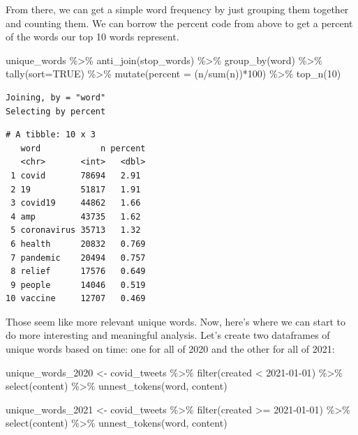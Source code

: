 \documentclass[
  letterpaper,
  DIV=11,
  numbers=noendperiod]{scrreprt}
\newenvironment{Shaded}{\begin{snugshade}}{\end{snugshade}}
\newcommand{\AttributeTok}[1]{\textcolor[rgb]{0.40,0.45,0.13}{#1}}
\newcommand{\ConstantTok}[1]{\textcolor[rgb]{0.56,0.35,0.01}{#1}}
\newcommand{\DecValTok}[1]{\textcolor[rgb]{0.68,0.00,0.00}{#1}}
\newcommand{\FunctionTok}[1]{\textcolor[rgb]{0.28,0.35,0.67}{#1}}
\newcommand{\NormalTok}[1]{\textcolor[rgb]{0.00,0.23,0.31}{#1}}
\newcommand{\OtherTok}[1]{\textcolor[rgb]{0.00,0.23,0.31}{#1}}
\newcommand{\SpecialCharTok}[1]{\textcolor[rgb]{0.37,0.37,0.37}{#1}}
\newcommand{\StringTok}[1]{\textcolor[rgb]{0.13,0.47,0.30}{#1}}
\begin{document}
From there, we can get a simple word frequency by just grouping them
together and counting them. We can borrow the percent code from above to
get a percent of the words our top 10 words represent.

\begin{Shaded}
\begin{Highlighting}[]
\NormalTok{unique\_words }\SpecialCharTok{\%\textgreater{}\%}
  \FunctionTok{anti\_join}\NormalTok{(stop\_words) }\SpecialCharTok{\%\textgreater{}\%}
  \FunctionTok{group\_by}\NormalTok{(word) }\SpecialCharTok{\%\textgreater{}\%}
  \FunctionTok{tally}\NormalTok{(}\AttributeTok{sort=}\ConstantTok{TRUE}\NormalTok{) }\SpecialCharTok{\%\textgreater{}\%}
  \FunctionTok{mutate}\NormalTok{(}\AttributeTok{percent =}\NormalTok{ (n}\SpecialCharTok{/}\FunctionTok{sum}\NormalTok{(n))}\SpecialCharTok{*}\DecValTok{100}\NormalTok{) }\SpecialCharTok{\%\textgreater{}\%}
  \FunctionTok{top\_n}\NormalTok{(}\DecValTok{10}\NormalTok{)}
\end{Highlighting}
\end{Shaded}

\begin{verbatim}
Joining, by = "word"
Selecting by percent
\end{verbatim}

\begin{verbatim}
# A tibble: 10 x 3
   word            n percent
   <chr>       <int>   <dbl>
 1 covid       78694   2.91 
 2 19          51817   1.91 
 3 covid19     44862   1.66 
 4 amp         43735   1.62 
 5 coronavirus 35713   1.32 
 6 health      20832   0.769
 7 pandemic    20494   0.757
 8 relief      17576   0.649
 9 people      14046   0.519
10 vaccine     12707   0.469
\end{verbatim}

Those seem like more relevant unique words. Now, here's where we can
start to do more interesting and meaningful analysis. Let's create two
dataframes of unique words based on time: one for all of 2020 and the
other for all of 2021:

\begin{Shaded}
\begin{Highlighting}[]
\NormalTok{unique\_words\_2020 }\OtherTok{\textless{}{-}}\NormalTok{ covid\_tweets }\SpecialCharTok{\%\textgreater{}\%}
  \FunctionTok{filter}\NormalTok{(created }\SpecialCharTok{\textless{}} \StringTok{\textquotesingle{}2021{-}01{-}01\textquotesingle{}}\NormalTok{) }\SpecialCharTok{\%\textgreater{}\%}
  \FunctionTok{select}\NormalTok{(content) }\SpecialCharTok{\%\textgreater{}\%}
  \FunctionTok{unnest\_tokens}\NormalTok{(word, content)}

\NormalTok{unique\_words\_2021 }\OtherTok{\textless{}{-}}\NormalTok{ covid\_tweets }\SpecialCharTok{\%\textgreater{}\%}
  \FunctionTok{filter}\NormalTok{(created }\SpecialCharTok{\textgreater{}=} \StringTok{\textquotesingle{}2021{-}01{-}01\textquotesingle{}}\NormalTok{) }\SpecialCharTok{\%\textgreater{}\%}
  \FunctionTok{select}\NormalTok{(content) }\SpecialCharTok{\%\textgreater{}\%}
  \FunctionTok{unnest\_tokens}\NormalTok{(word, content)}
\end{Highlighting}
\end{Shaded}
\end{document}
